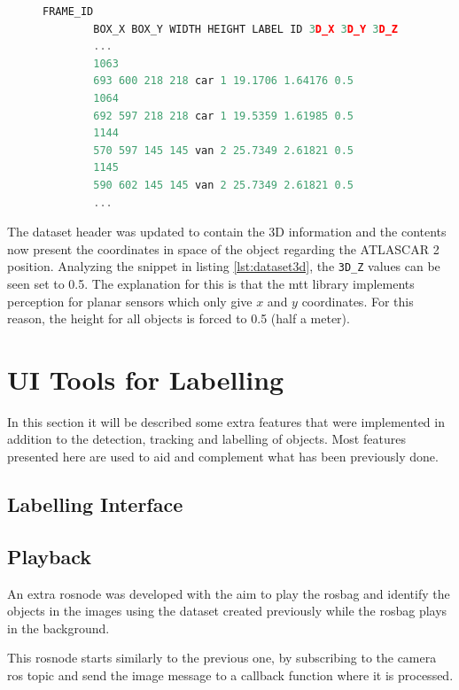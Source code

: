 \begin{figure}
	\begin{center}
		\begin{lstlisting}[label={lst:dataset3d}, caption={Snippet of the dataset with 3D capabilities},language=c++]
		FRAME_ID
		BOX_X BOX_Y WIDTH HEIGHT LABEL ID 3D_X 3D_Y 3D_Z
		...
		1063
		693 600 218 218 car 1 19.1706 1.64176 0.5
		1064
		692 597 218 218 car 1 19.5359 1.61985 0.5
		1144
		570 597 145 145 van 2 25.7349 2.61821 0.5
		1145
		590 602 145 145 van 2 25.7349 2.61821 0.5
		...		\end{lstlisting}
	\end{center}
\end{figure}

The dataset header was updated to contain the 3D information and the contents now present the coordinates in space of the object regarding the ATLASCAR 2 position. Analyzing the snippet in listing \ref{lst:dataset3d}, the \texttt{3D\_Z} values can be seen set to 0.5. The explanation for this is that the \gls{mtt} library implements perception for planar sensors which only give $x$ and $y$ coordinates. For this reason, the height for all objects is forced to 0.5 (half a meter). 

\section{UI Tools for Labelling}

In this section it will be described some extra features that were implemented in addition to the detection, tracking and labelling of objects. Most features presented here are used to aid and complement what has been previously done.

\subsection{Labelling Interface}

\subsection{Playback}

An extra rosnode was developed with the aim to play the rosbag and identify the objects in the images using the dataset created previously while the rosbag plays in the background.

This rosnode starts similarly to the previous one, by subscribing to the camera \gls{ros} topic and send the image message to a callback function where it is processed. 

